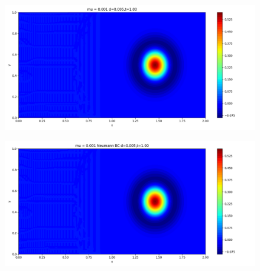 \documentclass[12pt]{article}
\begin{document}
\begin{figure}[H]
\begin{minipage}{\linewidth}
    \begin{minipage}{0.5\textwidth}
    \includegraphics[width=\linewidth]{figuresmu/mu3d0.005t1.00.png}
    \label{fig5}
    \end{minipage}\hfill
    \begin{minipage}{0.5\textwidth}
    \includegraphics[width=\linewidth]{figuresmu/mu3Nud0.005t1.00.png}
    \label{fig6}
    \end{minipage}
    \vspace{-1.5em}
    

\end{minipage}
\end{figure}
\end{document}
